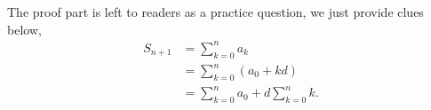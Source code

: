 The proof part is left to readers as a practice question, we just provide clues below,
\begin{equation}\label{E:ap-1}
    \begin{aligned}
        S_{n+1} &= \sum_{k=0}^n a_k \\
            &= \sum_{k=0}^n (a_0+kd) \\
            &= \sum_{k=0}^n a_0 + d\sum_{k=0}^n k.
    \end{aligned}
\end{equation}
